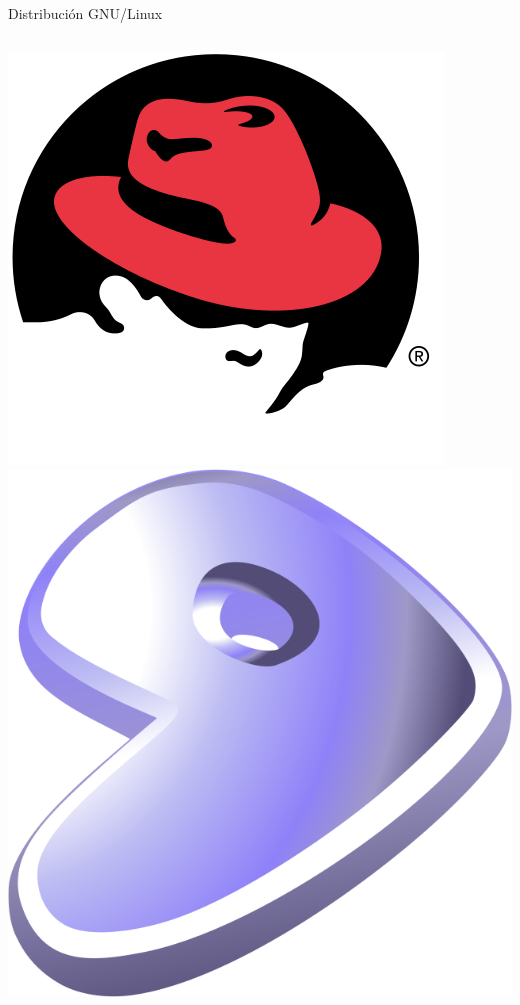 \documentclass{beamer}
\begin{document}
\begin{frame}{Distribución GNU/Linux}
\begin{columns}[t]
\centering
\includegraphics[scale=0.09]{redhat.png}\\
\includegraphics[scale=0.09]{gentoo.png}
\centering

\end{columns}
\end{frame}
\end{document}
